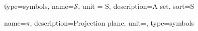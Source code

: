
{%
  type=symbols,
  name={$\mathcal{S}$},%
  unit = {S},
  description={A set},%
  sort={S}%
}

{
    name=\ensuremath{\pi},
    description={Projection plane},
    unit={},
    type=symbols
}

